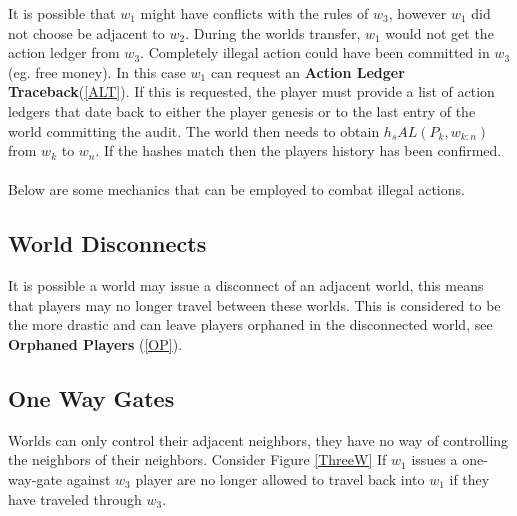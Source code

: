 \documentclass[runningheads,a4paper]{llncs}
\begin{document}
It is possible that $w_1$ might have conflicts with the rules of $w_3$, however $w_1$ did not choose be adjacent to $w_2$. During the worlds transfer, $w_1$ would not get the action ledger from $w_3$. Completely illegal action could have been committed in $w_3$ (eg. free money). In this case $w_1$ can request an \textbf{Action Ledger Traceback}(\ref{ALT}). If this is requested, the player must provide a list of action ledgers that date back to either the player genesis or to the last entry of the world committing the audit. The world then needs to obtain $h_s{AL(P_k, w_{k:n})}$ from $w_k$ to $w_n$. If the hashes match then the players history has been confirmed. 
\\\\
Below are some mechanics that can be employed to combat illegal actions.



\subsection{World Disconnects}
\label{WD}
It is possible a world may issue a disconnect of an adjacent world, this means that players may no longer travel between these worlds. This is considered to be the more drastic and can leave players orphaned in the disconnected world, see \textbf{Orphaned Players} (\ref{OP}).




\subsection{One Way Gates} %
Worlds can only control their adjacent neighbors, they have no way of controlling the neighbors of their neighbors. Consider Figure \ref{ThreeW} If $w_1$ issues a one-way-gate against $w_3$ player are no longer allowed to travel back into $w_1$ if they have traveled through $w_3$.
\end{document}
